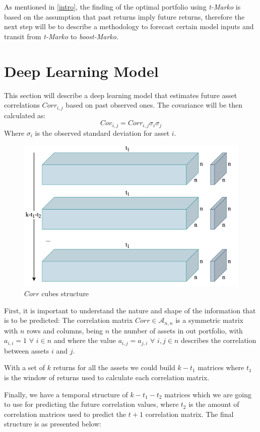 \documentclass{article}
\newcommand\mat[1]{\mathcal{#1}}
\begin{document}
As mentioned in \ref{intro}, the finding of the optimal portfolio using \textit{t-Marko} is based on the assumption that past returns imply future returns, therefore the next step will be to describe a methodology to forecast certain model inputs and transit from \textit{t-Marko} to \textit{boost-Marko}.


\section{Deep Learning Model}
This section will describe a deep learning model that estimates future asset correlations $Corr_{i,j}$ based on past observed ones. The covariance will be then calculated as: $$Cov_{i,j} = Corr_{i,j}\sigma_{i}\sigma_{j}$$
Where $\sigma_{i}$ is the observed standard deviation for asset $i$.


\begin{figure}
\includegraphics[width=1\linewidth]{Plots/Diagram_v3.png}
\caption{$Corr$ cubes structure}\label{wrap-fig:1}
\end{figure}
First, it is important to understand the nature and shape of the information that is to be predicted: The correlation matrix $Corr \in \mat{A}_{n,n}$ is a symmetric matrix with $n$ rows and columns, being $n$ the number of assets in out portfolio, with $a_{i,i} = 1$ $\forall$ $i \in n$ and where the value $a_{i,j} = a_{j,i}$ $\forall$ $i,j \in n$ describes the correlation between assets $i$ and $j$.

With a set of $k$ returns for all the assets we could build $k-t_{1}$ matrices where $t_{1}$ is the window of returns used to calculate each correlation matrix. 

Finally, we have a temporal structure of $k-t_{1} - t_{2}$ matrices which we are going to use for predicting the future correlation values, where $t_{2}$ is the amount of correlation matrices used to predict the $t + 1$ correlation matrix. The final structure is as presented below:
\end{document}
